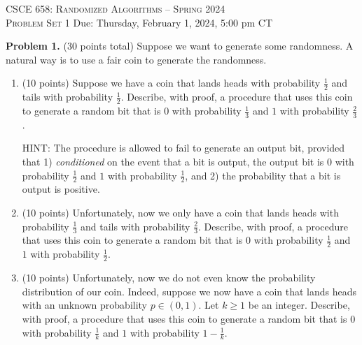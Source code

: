 \documentclass[11pt]{article}
\begin{document}
\begin{center}
{\Large\textsc{CSCE 658: Randomized Algorithms -- Spring 2024 \\ 
Problem Set 1}}
\vskip 0.1in
Due: Thursday, February 1, 2024, 5:00 pm CT
\end{center}
\textbf{Problem 1.} (30 points total)
Suppose we want to generate some randomness. 
A natural way is to use a fair coin to generate the randomness. 
\begin{enumerate}
\item (10 points)
Suppose we have a coin that lands heads with probability $\frac{1}{2}$ and tails with probability $\frac{1}{2}$. 
Describe, with proof, a procedure that uses this coin to generate a random bit that is $0$ with probability $\frac{1}{3}$ and $1$ with probability $\frac{2}{3}$.

\noindent
HINT: The procedure is allowed to fail to generate an output bit, provided that 1) \emph{conditioned} on the event that a bit is output, the output bit is $0$ with probability $\frac{1}{2}$ and $1$ with probability $\frac{1}{2}$, and 2) the probability that a bit is output is positive.  
\item (10 points)
Unfortunately, now we only have a coin that lands heads with probability $\frac{1}{3}$ and tails with probability $\frac{2}{3}$. 
Describe, with proof, a procedure that uses this coin to generate a random bit that is $0$ with probability $\frac{1}{2}$ and $1$ with probability $\frac{1}{2}$. 
\item (10 points)
Unfortunately, now we do not even know the probability distribution of our coin. 
Indeed, suppose we now have a coin that lands heads with an unknown probability $p\in(0,1)$. 
Let $k\ge 1$ be an integer. 
Describe, with proof, a procedure that uses this coin to generate a random bit that is $0$ with probability $\frac{1}{k}$ and $1$ with probability $1-\frac{1}{k}$. 
\end{enumerate}
\end{document}
